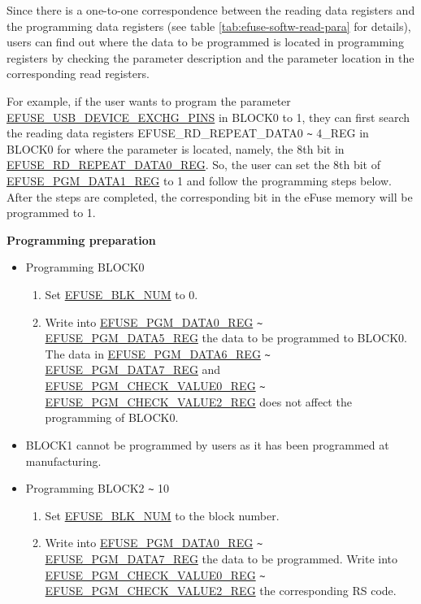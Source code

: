 \documentclass[main\_\_EN.tex]{subfiles}
\begin{document}
Since there is a one-to-one correspondence between the reading data registers and the programming data registers (see table \ref{tab:efuse-softw-read-para} for details), users can find out where the data to be programmed is located in programming registers by checking the parameter description and the parameter location in the corresponding read registers.

For example, if the user wants to program the parameter \hyperref[fielddesc:EFUSEUSBDEVICEEXCHGPINS]{EFUSE\_USB\_DEVICE\_EXCHG\_PINS} in BLOCK0 to 1, they can first search the reading data registers EFUSE\_RD\_REPEAT\_DATA0 \verb+~+ 4\_REG in BLOCK0 for where the parameter is located, namely, the 8th bit in \hyperref[regdesc:EFUSERDREPEATDATA0REG]{EFUSE\_RD\_REPEAT\_DATA0\_REG}. So, the user can set the 8th bit of \hyperref[regdesc:EFUSEPGMDATANREG]{EFUSE\_PGM\_DATA1\_REG} 
to 1 and follow the programming steps below. After the steps are completed, the corresponding bit in the eFuse memory will be programmed to 1.

{\bfseries Programming preparation} 

\begin{itemize}
    \item Programming BLOCK0
    \begin{enumerate}
        \item Set \hyperref[fielddesc:EFUSEBLKNUM]{EFUSE\_BLK\_NUM} to 0.
        \item Write into \hyperref[regdesc:EFUSEPGMDATANREG]{EFUSE\_PGM\_DATA0\_REG} \verb+~+ \hyperref[regdesc:EFUSEPGMDATANREG]{EFUSE\_PGM\_DATA5\_REG} the data to be programmed to BLOCK0. \\
        The data in \hyperref[regdesc:EFUSEPGMDATANREG]{EFUSE\_PGM\_DATA6\_REG} \verb+~+ \hyperref[regdesc:EFUSEPGMDATANREG]{EFUSE\_PGM\_DATA7\_REG} and \hyperref[regdesc:EFUSEPGMCHECKVALUENREG]{EFUSE\_PGM\_CHECK\_VALUE0\_REG} \verb+~+ \hyperref[regdesc:EFUSEPGMCHECKVALUENREG]{EFUSE\_PGM\_CHECK\_VALUE2\_REG} does not affect the programming of BLOCK0.
    \end{enumerate}
    \item BLOCK1 cannot be programmed by users as it has been programmed at manufacturing.
    \item Programming BLOCK2 \verb+~+ 10
    \begin{enumerate}
        \item Set \hyperref[fielddesc:EFUSEBLKNUM]{EFUSE\_BLK\_NUM} to the block number.
        \item Write into \hyperref[regdesc:EFUSEPGMDATANREG]{EFUSE\_PGM\_DATA0\_REG} \verb+~+ \hyperref[regdesc:EFUSEPGMDATANREG]{EFUSE\_PGM\_DATA7\_REG} the data to be programmed. Write into \hyperref[regdesc:EFUSEPGMCHECKVALUENREG]{EFUSE\_PGM\_CHECK\_VALUE0\_REG}  \verb+~+ \hyperref[regdesc:EFUSEPGMCHECKVALUENREG]{EFUSE\_PGM\_CHECK\_VALUE2\_REG} the corresponding RS code.
    \end{enumerate}
\end{itemize}
\end{document}
